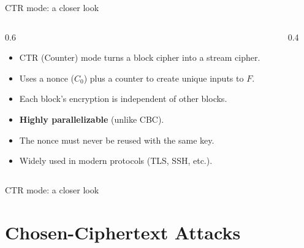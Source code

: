 \ifdefined\PRESENTATION\else\PassOptionsToClass{handout}{beamer}\fi\documentclass[aspectratio=169, lualatex]{beamer}
\begin{document}
\begin{frame}{CTR mode: a closer look}
	\begin{columns}[c]
		\begin{column}{0.6\textwidth}
			\begin{itemize}[<+->]
				\item CTR (Counter) mode turns a block cipher into a stream cipher.
				\item Uses a nonce ($C_0$) plus a counter to create unique inputs to $F$.
				\item Each block's encryption is independent of other blocks.
				\item \textbf{Highly parallelizable} (unlike CBC).
				\item The nonce must never be reused with the same key.
				\item Widely used in modern protocols (TLS, SSH, etc.).
			\end{itemize}
		\end{column}
		\begin{column}{0.4\textwidth}
		\end{column}
	\end{columns}
\end{frame}

\begin{frame}{CTR mode: a closer look}
	\vspace{-0.3cm}
\end{frame}

\section{Chosen-Ciphertext Attacks}
\end{document}
